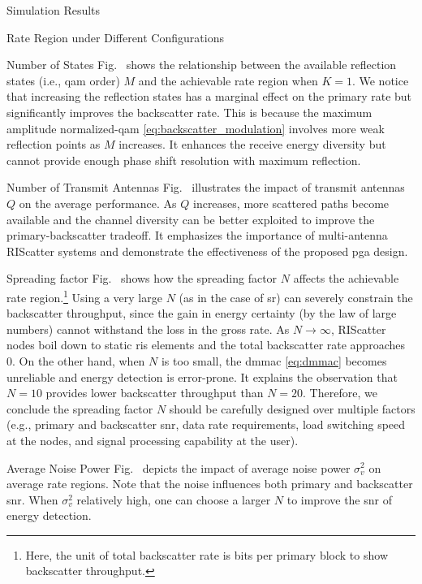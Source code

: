 \documentclass[journal]{IEEEtran}
\begin{document}
\begin{section}{Simulation Results}
\begin{subsection}{Rate Region under Different Configurations}
		\begin{subsubsection}{Number of States}
			Fig.~ shows the relationship between the available reflection states (i.e., \gls{qam} order) $M$ and the achievable rate region when $K=1$.
			We notice that increasing the reflection states has a marginal effect on the primary rate but significantly improves the backscatter rate.
			This is because the maximum amplitude normalized-\gls{qam} \eqref{eq:backscatter_modulation} involves more weak reflection points as $M$ increases.
			It enhances the receive energy diversity but cannot provide enough phase shift resolution with maximum reflection.
		\end{subsubsection}

		\begin{subsubsection}{Number of Transmit Antennas}
			Fig.~ illustrates the impact of transmit antennas $Q$ on the average performance.
			As $Q$ increases, more scattered paths become available and the channel diversity can be better exploited to improve the primary-backscatter tradeoff.
			It emphasizes the importance of multi-antenna RIScatter systems and demonstrate the effectiveness of the proposed \gls{pga} design.
		\end{subsubsection}

		\begin{subsubsection}{Spreading factor}
			Fig.~ shows how the spreading factor $N$ affects the achievable rate region.\footnote{Here, the unit of total backscatter rate is bits per primary block to show backscatter throughput.}
			Using a very large $N$ (as in the case of \gls{sr}) can severely constrain the backscatter throughput, since the gain in energy certainty (by the law of large numbers) cannot withstand the loss in the gross rate.
			As $N \to \infty$, RIScatter nodes boil down to static \gls{ris} elements and the total backscatter rate approaches \num{0}.
			On the other hand, when $N$ is too small, the \gls{dmmac} \eqref{eq:dmmac} becomes unreliable and energy detection is error-prone.
			It explains the observation that $N=10$ provides lower backscatter throughput than $N=20$.
			Therefore, we conclude the spreading factor $N$ should be carefully designed over multiple factors (e.g., primary and backscatter \gls{snr}, data rate requirements, load switching speed at the nodes, and signal processing capability at the user).
		\end{subsubsection}

		\begin{subsubsection}{Average Noise Power}
			Fig.~ depicts the impact of average noise power $\sigma_v^2$ on average rate regions.
			Note that the noise influences both primary and backscatter \gls{snr}.
			When $\sigma_v^2$ relatively high, one can choose a larger $N$ to improve the \gls{snr} of energy detection.
		\end{subsubsection}


\end{subsection}
\end{section}
\end{document}
